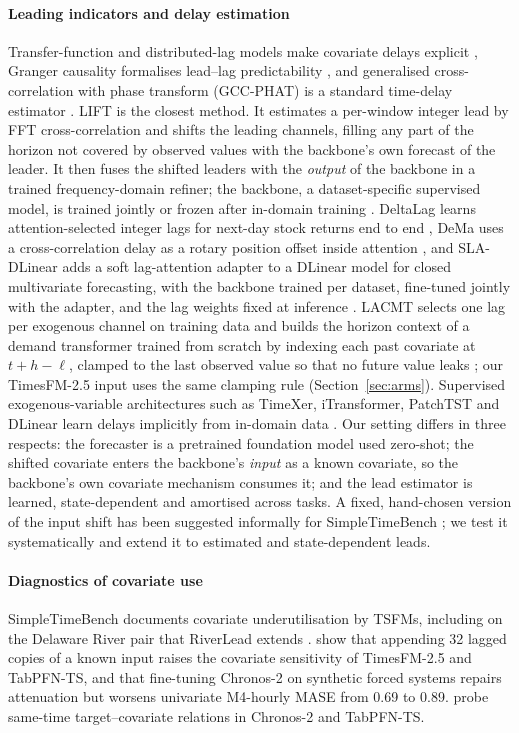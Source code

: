 \documentclass[preprint,11pt,authoryear]{elsarticle}
\begin{document}
\paragraph{Leading indicators and delay estimation} Transfer-function and distributed-lag models make covariate delays explicit \citep{box1970,box2008,almon1965}, Granger causality formalises lead--lag predictability \citep{granger1969}, and generalised cross-correlation with phase transform (GCC-PHAT) is a standard time-delay estimator \citep{knapp1976}. LIFT is the closest method. It estimates a per-window integer lead by FFT cross-correlation and shifts the leading channels, filling any part of the horizon not covered by observed values with the backbone's own forecast of the leader. It then fuses the shifted leaders with the \emph{output} of the backbone in a trained frequency-domain refiner; the backbone, a dataset-specific supervised model, is trained jointly or frozen after in-domain training \citep{zhao2024lift}. DeltaLag learns attention-selected integer lags for next-day stock returns end to end \citep{zhou2025deltalag}, DeMa uses a cross-correlation delay as a rotary position offset inside attention \citep{an2026dema}, and SLA-DLinear adds a soft lag-attention adapter to a DLinear model for closed multivariate forecasting, with the backbone trained per dataset, fine-tuned jointly with the adapter, and the lag weights fixed at inference \citep{luo2026sladlinear}. LACMT selects one lag per exogenous channel on training data and builds the horizon context of a demand transformer trained from scratch by indexing each past covariate at $t+h-\ell$, clamped to the last observed value so that no future value leaks \citep{vale2026lacmt}; our TimesFM-2.5 input uses the same clamping rule (Section~\ref{sec:arms}). Supervised exogenous-variable architectures such as TimeXer, iTransformer, PatchTST and DLinear learn delays implicitly from in-domain data \citep{wang2024timexer,liu2024itransformer,nie2023patchtst,zeng2023dlinear}. Our setting differs in three respects: the forecaster is a pretrained foundation model used zero-shot; the shifted covariate enters the backbone's \emph{input} as a known covariate, so the backbone's own covariate mechanism consumes it; and the lead estimator is learned, state-dependent and amortised across tasks. A fixed, hand-chosen version of the input shift has been suggested informally for SimpleTimeBench \citep{jjakimoto2026issue1936}; we test it systematically and extend it to estimated and state-dependent leads.

\paragraph{Diagnostics of covariate use} SimpleTimeBench documents covariate underutilisation by TSFMs, including on the Delaware River pair that RiverLead extends \citep{ghoroghchian2026foundations}. \citet{won2026attenuated} show that appending 32 lagged copies of a known input raises the covariate sensitivity of TimesFM-2.5 and TabPFN-TS, and that fine-tuning Chronos-2 on synthetic forced systems repairs attenuation but worsens univariate M4-hourly MASE from 0.69 to 0.89. \citet{berthelier2026investigating} probe same-time target--covariate relations in Chronos-2 and TabPFN-TS.
\end{document}
